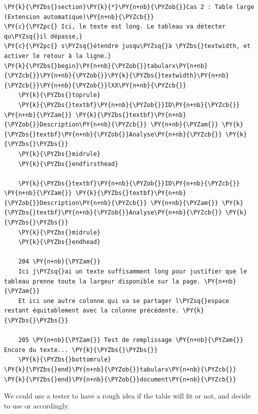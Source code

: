 \documentclass[a4paper,twoside]{article}
\begin{document}
\begin{tscode}[lang=latex, engine=pygments]
\begin{Verbatim}[commandchars=\\\{\},breaklines, breakanywhere, commandchars=\\\{\}]
\PY{k}{\PYZbs{}section}\PY{k}{*}\PY{n+nb}{\PYZob{}}Cas 2 : Table large (Extension automatique)\PY{n+nb}{\PYZcb{}}
\PY{c}{\PYZpc{} Ici, le texte est long. Le tableau va détecter qu\PYZsq{}il dépasse,}
\PY{c}{\PYZpc{} s\PYZsq{}étendre jusqu\PYZsq{}à \PYZbs{}textwidth, et activer le retour à la ligne.}
\PY{k}{\PYZbs{}begin}\PY{n+nb}{\PYZob{}}tabularx\PY{n+nb}{\PYZcb{}}\PY{n+nb}{\PYZob{}}\PY{k}{\PYZbs{}textwidth}\PY{n+nb}{\PYZcb{}}\PY{n+nb}{\PYZob{}}lXX\PY{n+nb}{\PYZcb{}}
    \PY{k}{\PYZbs{}toprule}
    \PY{k}{\PYZbs{}textbf}\PY{n+nb}{\PYZob{}}ID\PY{n+nb}{\PYZcb{}} \PY{n+nb}{\PYZam{}} \PY{k}{\PYZbs{}textbf}\PY{n+nb}{\PYZob{}}Description\PY{n+nb}{\PYZcb{}} \PY{n+nb}{\PYZam{}} \PY{k}{\PYZbs{}textbf}\PY{n+nb}{\PYZob{}}Analyse\PY{n+nb}{\PYZcb{}} \PY{k}{\PYZbs{}\PYZbs{}}
    \PY{k}{\PYZbs{}midrule}
    \PY{k}{\PYZbs{}endfirsthead}

    \PY{k}{\PYZbs{}textbf}\PY{n+nb}{\PYZob{}}ID\PY{n+nb}{\PYZcb{}} \PY{n+nb}{\PYZam{}} \PY{k}{\PYZbs{}textbf}\PY{n+nb}{\PYZob{}}Description\PY{n+nb}{\PYZcb{}} \PY{n+nb}{\PYZam{}} \PY{k}{\PYZbs{}textbf}\PY{n+nb}{\PYZob{}}Analyse\PY{n+nb}{\PYZcb{}} \PY{k}{\PYZbs{}\PYZbs{}}
    \PY{k}{\PYZbs{}midrule}
    \PY{k}{\PYZbs{}endhead}

    204 \PY{n+nb}{\PYZam{}}
    Ici j\PYZsq{}ai un texte suffisamment long pour justifier que le tableau prenne toute la largeur disponible sur la page. \PY{n+nb}{\PYZam{}}
    Et ici une autre colonne qui va se partager l\PYZsq{}espace restant équitablement avec la colonne précédente. \PY{k}{\PYZbs{}\PYZbs{}}

    205 \PY{n+nb}{\PYZam{}} Test de remplissage \PY{n+nb}{\PYZam{}} Encore du texte... \PY{k}{\PYZbs{}\PYZbs{}}
    \PY{k}{\PYZbs{}bottomrule}
\PY{k}{\PYZbs{}end}\PY{n+nb}{\PYZob{}}tabularx\PY{n+nb}{\PYZcb{}}
\PY{k}{\PYZbs{}end}\PY{n+nb}{\PYZob{}}document\PY{n+nb}{\PYZcb{}}
\end{Verbatim}
\end{tscode}
We could use a tester to have a rough idea if the table will fit or not, and decide to use  or  accordingly.
\end{document}
